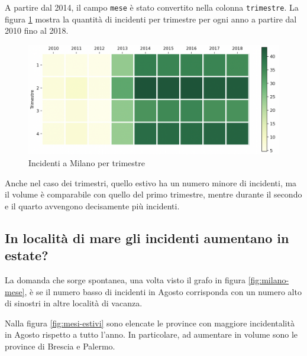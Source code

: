 \documentclass[a4paper]{report}
\newcommand{\columnstyle}[1]{\texttt{#1}}
\begin{document}
A partire dal 2014, il campo \columnstyle{mese} è stato convertito nella 
colonna \columnstyle{trimestre}.
La figura \ref{fig:milano-trimestri} mostra la quantità di incidenti per trimestre per ogni 
anno a partire dal 2010 fino al 2018.

\begin{figure}
    \includegraphics[width=\linewidth]{../src/incidenti/incidenti_senza_coords/mese_incidenti/trimestri.png}
    \caption{Incidenti a Milano per trimestre}
    \label{fig:milano-trimestri}
\end{figure}

Anche nel caso dei trimestri, quello estivo ha un numero minore di incidenti, ma il volume è 
comparabile con quello del primo trimestre, mentre durante il secondo e il quarto avvengono 
decisamente più incidenti.


\subsection{In località di mare gli incidenti aumentano in estate?}

La domanda che sorge spontanea, una volta visto il grafo in figura \ref{fig:milano-mese}, è se 
il numero basso di incidenti in Agosto corrisponda con un numero alto di sinostri in altre località 
di vacanza. 

Nalla figura \ref{fig:mesi-estivi} sono elencate le province con maggiore incidentalità 
in Agosto rispetto a tutto l'anno. In particolare, ad aumentare in volume sono le 
province di Brescia e Palermo.
\end{document}
